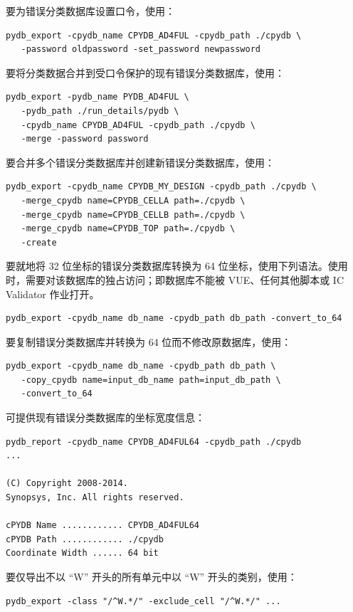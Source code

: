 要为错误分类数据库设置口令，使用：
\begin{lstlisting}[style=shell]
pydb_export -cpydb_name CPYDB_AD4FUL -cpydb_path ./cpydb \
   -password oldpassword -set_password newpassword
\end{lstlisting}

要将分类数据合并到受口令保护的现有错误分类数据库，使用：
\begin{lstlisting}[style=shell]
pydb_export -pydb_name PYDB_AD4FUL \
   -pydb_path ./run_details/pydb \
   -cpydb_name CPYDB_AD4FUL -cpydb_path ./cpydb \
   -merge -password password
\end{lstlisting}

要合并多个错误分类数据库并创建新错误分类数据库，使用：
\begin{lstlisting}[style=shell]
pydb_export -cpydb_name CPYDB_MY_DESIGN -cpydb_path ./cpydb \
   -merge_cpydb name=CPYDB_CELLA path=./cpydb \
   -merge_cpydb name=CPYDB_CELLB path=./cpydb \
   -merge_cpydb name=CPYDB_TOP path=./cpydb \
   -create
\end{lstlisting}

要就地将 32 位坐标的错误分类数据库转换为 64 位坐标，使用下列语法。使用  时，需要对该数据库的独占访问；即数据库不能被 VUE、任何其他脚本或 IC Validator 作业打开。
\begin{lstlisting}[style=shell]
pydb_export -cpydb_name db_name -cpydb_path db_path -convert_to_64
\end{lstlisting}

要复制错误分类数据库并转换为 64 位而不修改原数据库，使用：
\begin{lstlisting}[style=shell]
pydb_export -cpydb_name db_name -cpydb_path db_path \
   -copy_cpydb name=input_db_name path=input_db_path \
   -convert_to_64
\end{lstlisting}

\cmd{pydb\_report} 可提供现有错误分类数据库的坐标宽度信息：
\begin{lstlisting}[style=shell]
pydb_report -cpydb_name CPYDB_AD4FUL64 -cpydb_path ./cpydb
...

(C) Copyright 2008-2014.
Synopsys, Inc. All rights reserved.

cPYDB Name ............ CPYDB_AD4FUL64
cPYDB Path ............ ./cpydb
Coordinate Width ...... 64 bit
\end{lstlisting}

要仅导出不以 ``W'' 开头的所有单元中以 ``W'' 开头的类别，使用：
\begin{lstlisting}[style=shell]
pydb_export -class "/^W.*/" -exclude_cell "/^W.*/" ...
\end{lstlisting}

